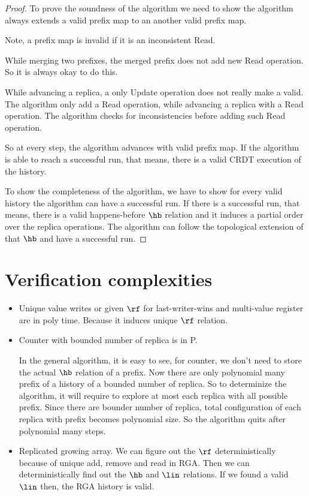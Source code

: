\begin{proof}
 To prove the soundness of the algorithm we need to show the algorithm always extends a valid prefix map to an another valid prefix map.

 Note, a prefix map is invalid if it is an inconsistent Read.

 While merging two prefixes, the merged prefix does not add new Read operation. So it is always okay to do this.

 While advancing a replica, a only Update operation does not really make a valid. The algorithm only add a Read operation, while advancing a replica with a Read operation. The algorithm checks for inconsistencies before adding such Read operation.

 So at every step, the algorithm advances with valid prefix map. If the algorithm is able to reach a successful run, that means, there is a valid CRDT execution of the history.

 To show the completeness of the algorithm, we have to show for every valid history the algorithm can have a successful run. If there is a successful run, that means, there is a valid happens-before $\hb$ relation and it induces a partial order over the replica operations. The algorithm can follow the topological extension of that $\hb$ and have a successful run.
\end{proof}


\section{Verification complexities}

\begin{itemize}
 \item Unique value writes or given $\rf$ for last-writer-wins and multi-value register are in poly time. Because it induces unique $\rf$ relation.

 \item Counter with bounded number of replica is in P.

    In the general algorithm, it is easy to see, for counter, we don't need to store the actual $\hb$ relation of a prefix. Now there are only polynomial many prefix of a history of a bounded number of replica. So to determinize the algorithm, it will require to explore at most each replica with all possible prefix. Since there are bounder number of replica, total configuration of each replica with prefix becomes polynomial size. So the algorithm quits after polynomial many steps.

 \item Replicated growing array. We can figure out the $\rf$ deterministically because of unique add, remove and read in RGA. Then we can deterministically find out the $\hb$ and $\lin$ relations. If we found a valid $\lin$ then, the RGA history is valid.
\end{itemize}

